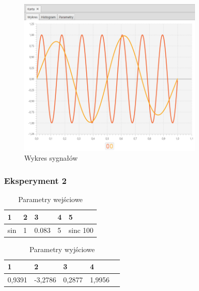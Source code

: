 \documentclass[12pt]{article}
\begin{document}
{{{                \begin{figure}[H]
                    \centering
                    \includegraphics[width=0.8\textwidth]{img/result/experiment3/01/data_draw_original_chart_recon_output_130511.png}
                    \caption{Wykres sygnałów}
                \end{figure}
            }
            \newpage

            \subsubsection{Eksperyment 2} {
                \begin{table}[H]
                    \centering
                    \begin{tabular}{|l|l|l|l|l|}
                        \hline
                        1 & 2 & 3 & 4 & 5   \\ \hline
                        sin & 1 & 0.083 & 5 & sinc 100   \\ \hline
                    \end{tabular}
                    \caption{Parametry wejściowe}
                \end{table}

                \begin{table}[H]
                    \centering
                    \begin{tabular}{|l|l|l|l|l|}
                        \hline
                        1 & 2 & 3 & 4   \\ \hline
                        0,9391 & -3,2786 & 0,2877 & 1,9956 \\ \hline
                    \end{tabular}
                    \caption{Parametry wyjściowe}
                \end{table}


}}}
\end{document}

